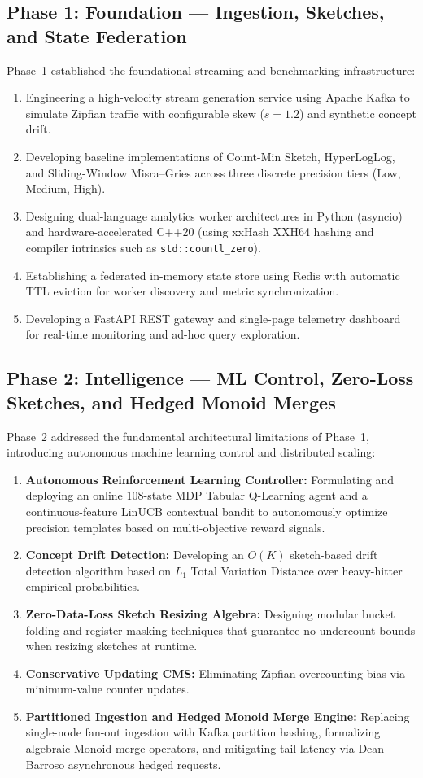 \subsection{Phase 1: Foundation — Ingestion, Sketches, and State Federation}
Phase~1 established the foundational streaming and benchmarking infrastructure:
\begin{enumerate}
 \item Engineering a high-velocity stream generation service using Apache Kafka to simulate Zipfian traffic with configurable skew ($s = 1.2$) and synthetic concept drift.
 \item Developing baseline implementations of Count-Min Sketch, HyperLogLog, and Sliding-Window Misra--Gries across three discrete precision tiers (Low, Medium, High).
 \item Designing dual-language analytics worker architectures in Python (asyncio) and hardware-accelerated C++20 (using xxHash XXH64 hashing and compiler intrinsics such as \texttt{std::countl\_zero}).
 \item Establishing a federated in-memory state store using Redis with automatic TTL eviction for worker discovery and metric synchronization.
 \item Developing a FastAPI REST gateway and single-page telemetry dashboard for real-time monitoring and ad-hoc query exploration.
\end{enumerate}

\subsection{Phase 2: Intelligence — ML Control, Zero-Loss Sketches, and Hedged Monoid Merges}
Phase~2 addressed the fundamental architectural limitations of Phase~1, introducing autonomous machine learning control and distributed scaling:
\begin{enumerate}
 \item \textbf{Autonomous Reinforcement Learning Controller:} Formulating and deploying an online 108-state MDP Tabular Q-Learning agent and a continuous-feature LinUCB contextual bandit to autonomously optimize precision templates based on multi-objective reward signals.
 \item \textbf{Concept Drift Detection:} Developing an $O(K)$ sketch-based drift detection algorithm based on $L_1$ Total Variation Distance over heavy-hitter empirical probabilities.
 \item \textbf{Zero-Data-Loss Sketch Resizing Algebra:} Designing modular bucket folding and register masking techniques that guarantee no-undercount bounds when resizing sketches at runtime.
 \item \textbf{Conservative Updating CMS:} Eliminating Zipfian overcounting bias via minimum-value counter updates.
 \item \textbf{Partitioned Ingestion and Hedged Monoid Merge Engine:} Replacing single-node fan-out ingestion with Kafka partition hashing, formalizing algebraic Monoid merge operators, and mitigating tail latency via Dean--Barroso asynchronous hedged requests.
\end{enumerate}

